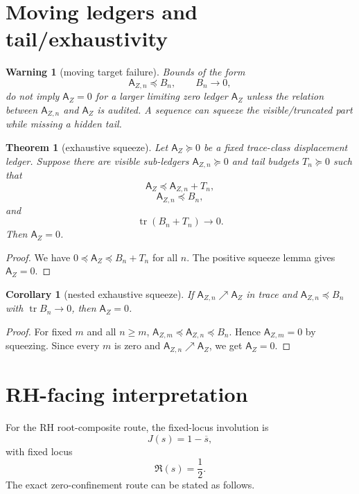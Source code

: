 \documentclass[11pt]{article}
\newtheorem{theorem}{Theorem}
\newtheorem{corollary}{Corollary}
\newtheorem{warning}{Warning}
\newcommand{\AZ}{\mathsf A_Z}
\newcommand{\tr}{\operatorname{tr}}
\begin{document}
\section{Moving ledgers and tail/exhaustivity}

\begin{warning}[moving target failure]
Bounds of the form
\[
  \mathsf A_{Z,n}\preceq B_n,
  \qquad
  B_n\to0,
\]
do not imply $\AZ=0$ for a larger limiting zero ledger $\AZ$ unless the relation between $\mathsf A_{Z,n}$ and $\AZ$ is audited. A sequence can squeeze the visible/truncated part while missing a hidden tail.
\end{warning}

\begin{theorem}[exhaustive squeeze]
Let $\AZ\succeq0$ be a fixed trace-class displacement ledger. Suppose there are visible sub-ledgers $\mathsf A_{Z,n}\succeq0$ and tail budgets $T_n\succeq0$ such that
\[
  \AZ \preceq \mathsf A_{Z,n}+T_n,
\]
\[
  \mathsf A_{Z,n}\preceq B_n,
\]
and
\[
  \tr(B_n+T_n)\to0.
\]
Then $\AZ=0$.
\end{theorem}

\begin{proof}
We have $0\preceq\AZ\preceq B_n+T_n$ for all $n$. The positive squeeze lemma gives $\AZ=0$.
\end{proof}

\begin{corollary}[nested exhaustive squeeze]
If $\mathsf A_{Z,n}\nearrow\AZ$ in trace and $\mathsf A_{Z,n}\preceq B_n$ with $\tr B_n\to0$, then $\AZ=0$.
\end{corollary}

\begin{proof}
For fixed $m$ and all $n\ge m$, $\mathsf A_{Z,m}\preceq \mathsf A_{Z,n}\preceq B_n$. Hence $\mathsf A_{Z,m}=0$ by squeezing. Since every $m$ is zero and $\mathsf A_{Z,n}\nearrow\AZ$, we get $\AZ=0$.
\end{proof}

\section{RH-facing interpretation}

For the RH root-composite route, the fixed-locus involution is
\[
  J(s)=1-\overline{s},
\]
with fixed locus
\[
  \Re(s)=\frac12.
\]
The exact zero-confinement route can be stated as follows.
\end{document}
